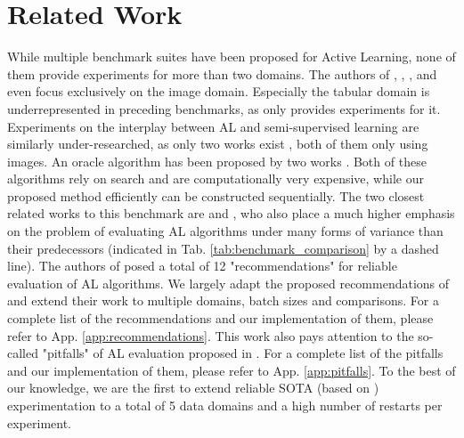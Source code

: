 \documentclass[]{article}
\begin{document}
\section{Related Work}
While multiple benchmark suites have been proposed for Active Learning, none of them provide experiments for more than two domains.
The authors of \cite{beck2021effective}, \cite{munjal2022towards}, \cite{li2022empirical}, \cite{ji2023randomness} and \cite{luth2024navigating} even focus exclusively on the image domain.
Especially the tabular domain is underrepresented in preceding benchmarks, as only \cite{zhan2022comparative} provides experiments for it.
Experiments on the interplay between AL and semi-supervised learning are similarly under-researched, as only two works exist \cite{li2022empirical, luth2024navigating}, both of them only using images.
An oracle algorithm has been proposed by two works \cite{zhou2021towards, zhan2022comparative}. 
Both of these algorithms rely on search and are computationally very expensive, while our proposed method efficiently can be constructed sequentially.
The two closest related works to this benchmark are \cite{ji2023randomness} and \cite{luth2024navigating}, who also place a much higher emphasis on the problem of evaluating AL algorithms under many forms of variance than their predecessors (indicated in Tab. \ref{tab:benchmark_comparison} by a dashed line).
The authors of \cite{ji2023randomness} posed a total of 12 "recommendations" for reliable evaluation of AL algorithms.
We largely adapt the proposed recommendations of \cite{ji2023randomness} and extend their work to multiple domains, batch sizes and comparisons.
For a complete list of the recommendations and our implementation of them, please refer to App. \ref{app:recommendations}.
This work also pays attention to the so-called "pitfalls" of AL evaluation proposed in \cite{luth2024navigating}.
For a complete list of the pitfalls and our implementation of them, please refer to App. \ref{app:pitfalls}.
To the best of our knowledge, we are the first to extend reliable SOTA (based on \cite{ji2023randomness, luth2024navigating}) experimentation to a total of 5 data domains and a high number of restarts per experiment.
\end{document}
